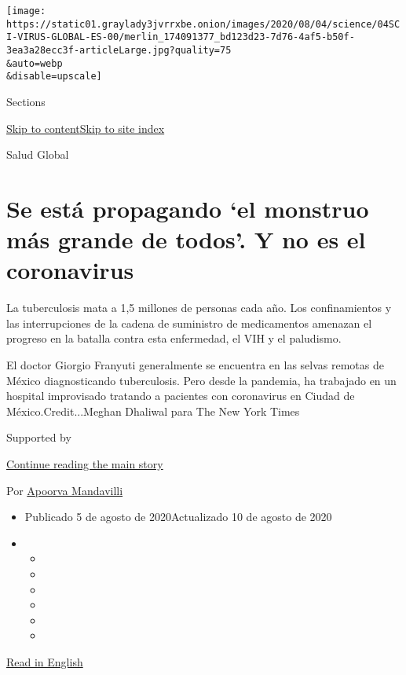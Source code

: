 \texttt{[image: https://static01.graylady3jvrrxbe.onion/images/2020/08/04/science/04SCI-VIRUS-GLOBAL-ES-00/merlin\_174091377\_bd123d23-7d76-4af5-b50f-3ea3a28ecc3f-articleLarge.jpg?quality=75\\\&auto=webp\\\&disable=upscale]}

Sections

\protect\hyperlink{site-content}{Skip to
content}\protect\hyperlink{site-index}{Skip to site index}

Salud Global

\hypertarget{se-estuxe1-propagando-el-monstruo-muxe1s-grande-de-todos-y-no-es-el-coronavirus}{%
\section{Se está propagando `el monstruo más grande de todos'. Y no es
el
coronavirus}\label{se-estuxe1-propagando-el-monstruo-muxe1s-grande-de-todos-y-no-es-el-coronavirus}}

La tuberculosis mata a 1,5 millones de personas cada año. Los
confinamientos y las interrupciones de la cadena de suministro de
medicamentos amenazan el progreso en la batalla contra esta enfermedad,
el VIH y el paludismo.

El doctor Giorgio Franyuti generalmente se encuentra en las selvas
remotas de México diagnosticando tuberculosis. Pero desde la pandemia,
ha trabajado en un hospital improvisado tratando a pacientes con
coronavirus en Ciudad de México.Credit...Meghan Dhaliwal para The New
York Times

Supported by

\protect\hyperlink{after-sponsor}{Continue reading the main story}

Por
\href{https://www.nytimes3xbfgragh.onion/by/apoorva-mandavilli}{Apoorva
Mandavilli}

\begin{itemize}
\item
  Publicado 5 de agosto de 2020Actualizado 10 de agosto de 2020
\item
  \begin{itemize}
  \item
  \item
  \item
  \item
  \item
  \item
  \end{itemize}
\end{itemize}

\href{https://www.nytimes3xbfgragh.onion/2020/08/03/health/coronavirus-tuberculosis-aids-malaria.html}{Read
in English}

